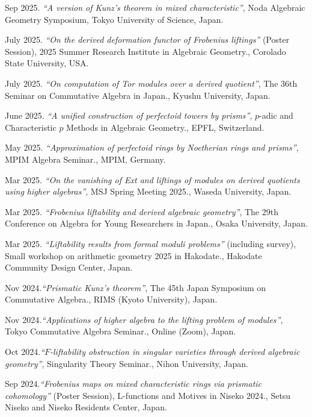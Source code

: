 \documentclass[10pt,a4paper,sans]{moderncv}
\begin{document}
\begin{etaremune}
  \item Sep 2025. \emph{``A version of Kunz's theorem in mixed characteristic''}, \textsf{Noda Algebraic Geometry Symposium}, Tokyo University of Science, Japan.
  \item July 2025. \emph{``On the derived deformation functor of Frobenius liftings''} (Poster Session), \textsf{2025 Summer Research Institute in Algebraic Geometry.}, Corolado State University, USA.
  \item July 2025. \emph{``On computation of Tor modules over a derived quotient''}, \textsf{The 36th Seminar on Commutative Algebra in Japan.}, Kyushu University, Japan.
  \item June 2025. \emph{``A unified construction of perfectoid towers by prisms''}, \textsf{$p$-adic and Characteristic \(p\) Methods in Algebraic Geometry.}, EPFL, Switzerland.
  \item May 2025. \emph{``Approximation of perfectoid rings by Noetherian rings and prisms''}, \textsf{MPIM Algebra Seminar.}, MPIM, Germany.
  \item Mar 2025. \emph{``On the vanishing of Ext and liftings of modules on derived quotients using higher algebras''}, \textsf{MSJ Spring Meeting 2025.}, Waseda University, Japan.
  \item Mar 2025. \emph{``Frobenius liftability and derived algebraic geometry''}, \textsf{The 29th Conference on Algebra for Young Researchers in Japan.}, Osaka University, Japan.
  \item Mar 2025. \emph{``Liftability results from formal moduli problems''} (including survey), \textsf{Small workshop on arithmetic geometry 2025 in Hakodate.}, Hakodate Community Design Center, Japan.
  \item Nov 2024.\emph{``Prismatic Kunz's theorem''}, \textsf{The 45th Japan Symposium on Commutative Algebra.}, RIMS (Kyoto University), Japan.
  \item Nov 2024.\emph{``Applications of higher algebra to the lifting problem of modules''}, \textsf{Tokyo Commutative Algebra Seminar.}, Online (Zoom), Japan.
  \item Oct 2024.\emph{``\(F\)-liftability obstruction in singular varieties through derived algebraic geometry''}, \textsf{Singularity Theory Seminar.}, Nihon University, Japan.
  \item Sep 2024.\emph{``Frobenius maps on mixed characteristic rings via prismatic cohomology''} (Poster Session), \textsf{L-functions and Motives in Niseko 2024.}, Setsu Niseko and Niseko Residents Center, Japan.

\end{etaremune}
\end{document}
